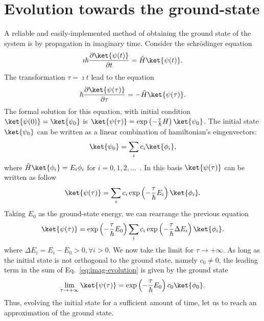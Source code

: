 \section{Evolution towards the ground-state}
A reliable and easily-implemented method of obtaining the ground state of the
system is by propagation in imaginary time. Consider the schr\"odinger equation
\begin{equation}
\imath \hbar \frac{\partial \ket{\psi(t)}}{\partial t} = \hat{H} \ket{\psi(t)}.
\end{equation}
The transformation $ \tau = \imath t$ lead to the equation
\begin{equation}
\hbar \frac{\partial \ket{\psi(\tau)}}{\partial \tau} = - \hat{H} \ket{\psi(\tau)}.
\end{equation}
The formal solution for this equation, with initial condition $\ket{\psi(0)} = \ket{\psi_0}$ is $\ket{\psi(\tau)} = \exp\left( -\frac{\tau}{\hbar} H \right) \ket{\psi_0}$. The initial state $\ket{\psi_0}$ can be written as a linear combination of hamiltonian's eingenvectors:
\begin{equation}
\ket{\psi_0} = \sum_i c_i \ket{\phi_i},
\end{equation}
where $\hat{H} \ket{\phi_i} = E_i \phi_i$ for $i = 0,1,2,\ldots$~. In this basis $\ket{\psi(\tau)}$ can be written as follow
\begin{equation}
\ket{\psi(\tau)} = \sum_i c_i \exp\left( -\frac{\tau}{\hbar} E_i \right) \ket{\phi_i}.
\end{equation}
Taking $E_0$ as the ground-state energy, we can rearrange the previous equation
\begin{equation} \label{eq:imag-evolution}
\ket{\psi(\tau)} = \exp \left( -\frac{\tau}{\hbar} E_0 \right) \sum_i c_i  \exp\left( -\frac{\tau}{\hbar} \Delta E_i \right) \ket{\phi_i}.
\end{equation}
where $\Delta E_i = E_i - E_0 > 0,  \forall i > 0$. We now take the limit for $\tau \rightarrow +\infty$. As long as the initial state is not orthogonal to the ground state, namely $c_0 \neq 0$, the leading term in the sum of Eq.~\eqref{eq:imag-evolution} is given by the ground state
\begin{equation}
\lim_{\tau \rightarrow +\infty} \ket{\psi(\tau)} = \exp \left( -\frac{\tau}{\hbar} E_0 \right) c_0 \ket{\phi_0}.
\end{equation}
Thus, evolving the initial state for a sufficient amount of time, let us to reach an  approximation of the ground state.


